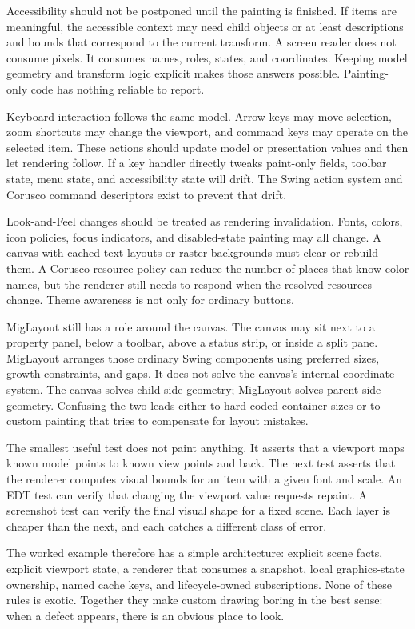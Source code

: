 Accessibility should not be postponed until the painting is finished. If items are meaningful, the accessible context may need child objects or at least descriptions and bounds that correspond to the current transform. A screen reader does not consume pixels. It consumes names, roles, states, and coordinates. Keeping model geometry and transform logic explicit makes those answers possible. Painting-only code has nothing reliable to report.

Keyboard interaction follows the same model. Arrow keys may move selection, zoom shortcuts may change the viewport, and command keys may operate on the selected item. These actions should update model or presentation values and then let rendering follow. If a key handler directly tweaks paint-only fields, toolbar state, menu state, and accessibility state will drift. The Swing action system and Corusco command descriptors exist to prevent that drift.

Look-and-Feel changes should be treated as rendering invalidation. Fonts, colors, icon policies, focus indicators, and disabled-state painting may all change. A canvas with cached text layouts or raster backgrounds must clear or rebuild them. A Corusco resource policy can reduce the number of places that know color names, but the renderer still needs to respond when the resolved resources change. Theme awareness is not only for ordinary buttons.

MigLayout still has a role around the canvas. The canvas may sit next to a property panel, below a toolbar, above a status strip, or inside a split pane. MigLayout arranges those ordinary Swing components using preferred sizes, growth constraints, and gaps. It does not solve the canvas's internal coordinate system. The canvas solves child-side geometry; MigLayout solves parent-side geometry. Confusing the two leads either to hard-coded container sizes or to custom painting that tries to compensate for layout mistakes.

The smallest useful test does not paint anything. It asserts that a viewport maps known model points to known view points and back. The next test asserts that the renderer computes visual bounds for an item with a given font and scale. An EDT test can verify that changing the viewport value requests repaint. A screenshot test can verify the final visual shape for a fixed scene. Each layer is cheaper than the next, and each catches a different class of error.

The worked example therefore has a simple architecture: explicit scene facts, explicit viewport state, a renderer that consumes a snapshot, local graphics-state ownership, named cache keys, and lifecycle-owned subscriptions. None of these rules is exotic. Together they make custom drawing boring in the best sense: when a defect appears, there is an obvious place to look.

